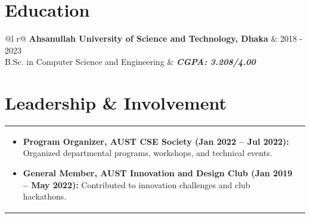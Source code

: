 \documentclass[a4paper,8pt]{article}
\begin{document}
\vfill
\section{Education}
\begin{tabularx}{\linewidth}{ @{}l r@{} }
\color[HTML]{1C033C} \textbf{Ahsanullah University of Science and Technology, Dhaka} & \hfill \color[HTML]{371e77} 2018 - 2023 \\
\color[HTML]{371e77} B.Sc. in Computer Science and Engineering & \hfill \color[HTML]{4B28A4} \textit{\textbf{CGPA: 3.208/4.00}} \\
\end{tabularx}

\vfill
\section{Leadership \& Involvement}
\begin{tabularx}{\linewidth}{ @{}l r@{} }
\begin{minipage}[t]{\linewidth}
\begin{itemize}[nosep,after=\strut, leftmargin=1.5em, itemsep=2pt]
\item \textbf{Program Organizer, AUST CSE Society (Jan 2022 – Jul 2022):} Organized departmental programs, workshops, and technical events.
\item \textbf{General Member, AUST Innovation and Design Club (Jan 2019 – May 2022):} Contributed to innovation challenges and club hackathons.
\end{itemize}
\end{minipage}
\end{tabularx}

\vfill
\end{document}
